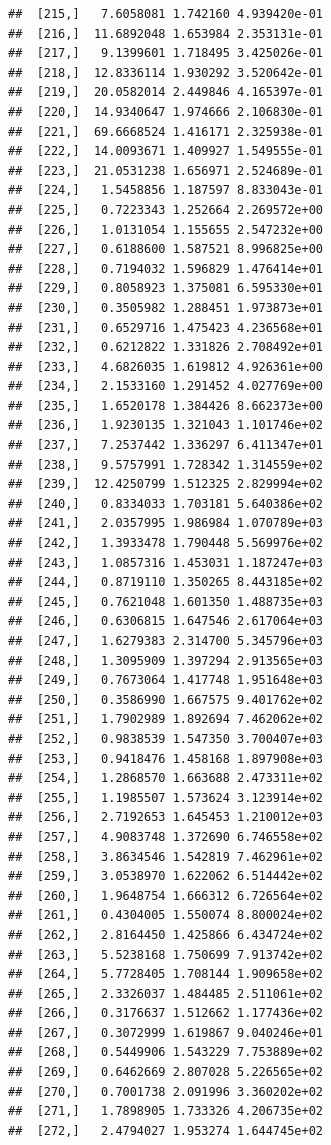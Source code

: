 \documentclass[article]{jss}\usepackage[]{graphicx}\usepackage[]{xcolor}
\makeatletter
\newenvironment{kframe}{%
 \def\at@end@of@kframe{}%
 \ifinner\ifhmode%
  \def\at@end@of@kframe{\end{minipage}}%
  \begin{minipage}{\columnwidth}%
 \fi\fi%
 \def\FrameCommand##1{\hskip\@totalleftmargin \hskip-\fboxsep
 \colorbox{shadecolor}{##1}\hskip-\fboxsep
     \hskip-\linewidth \hskip-\@totalleftmargin \hskip\columnwidth}%
 \MakeFramed {\advance\hsize-\width
   \@totalleftmargin\z@ \linewidth\hsize
   \@setminipage}}%
 {\par\unskip\endMakeFramed%
 \at@end@of@kframe}
\newenvironment{knitrout}{}{} %
\makeatother
\begin{document}
\begin{knitrout}
\begin{kframe}
\begin{verbatim}
##  [215,]   7.6058081 1.742160 4.939420e-01
##  [216,]  11.6892048 1.653984 2.353131e-01
##  [217,]   9.1399601 1.718495 3.425026e-01
##  [218,]  12.8336114 1.930292 3.520642e-01
##  [219,]  20.0582014 2.449846 4.165397e-01
##  [220,]  14.9340647 1.974666 2.106830e-01
##  [221,]  69.6668524 1.416171 2.325938e-01
##  [222,]  14.0093671 1.409927 1.549555e-01
##  [223,]  21.0531238 1.656971 2.524689e-01
##  [224,]   1.5458856 1.187597 8.833043e-01
##  [225,]   0.7223343 1.252664 2.269572e+00
##  [226,]   1.0131054 1.155655 2.547232e+00
##  [227,]   0.6188600 1.587521 8.996825e+00
##  [228,]   0.7194032 1.596829 1.476414e+01
##  [229,]   0.8058923 1.375081 6.595330e+01
##  [230,]   0.3505982 1.288451 1.973873e+01
##  [231,]   0.6529716 1.475423 4.236568e+01
##  [232,]   0.6212822 1.331826 2.708492e+01
##  [233,]   4.6826035 1.619812 4.926361e+00
##  [234,]   2.1533160 1.291452 4.027769e+00
##  [235,]   1.6520178 1.384426 8.662373e+00
##  [236,]   1.9230135 1.321043 1.101746e+02
##  [237,]   7.2537442 1.336297 6.411347e+01
##  [238,]   9.5757991 1.728342 1.314559e+02
##  [239,]  12.4250799 1.512325 2.829994e+02
##  [240,]   0.8334033 1.703181 5.640386e+02
##  [241,]   2.0357995 1.986984 1.070789e+03
##  [242,]   1.3933478 1.790448 5.569976e+02
##  [243,]   1.0857316 1.453031 1.187247e+03
##  [244,]   0.8719110 1.350265 8.443185e+02
##  [245,]   0.7621048 1.601350 1.488735e+03
##  [246,]   0.6306815 1.647546 2.617064e+03
##  [247,]   1.6279383 2.314700 5.345796e+03
##  [248,]   1.3095909 1.397294 2.913565e+03
##  [249,]   0.7673064 1.417748 1.951648e+03
##  [250,]   0.3586990 1.667575 9.401762e+02
##  [251,]   1.7902989 1.892694 7.462062e+02
##  [252,]   0.9838539 1.547350 3.700407e+03
##  [253,]   0.9418476 1.458168 1.897908e+03
##  [254,]   1.2868570 1.663688 2.473311e+02
##  [255,]   1.1985507 1.573624 3.123914e+02
##  [256,]   2.7192653 1.645453 1.210012e+03
##  [257,]   4.9083748 1.372690 6.746558e+02
##  [258,]   3.8634546 1.542819 7.462961e+02
##  [259,]   3.0538970 1.622062 6.514442e+02
##  [260,]   1.9648754 1.666312 6.726564e+02
##  [261,]   0.4304005 1.550074 8.800024e+02
##  [262,]   2.8164450 1.425866 6.434724e+02
##  [263,]   5.5238168 1.750699 7.913742e+02
##  [264,]   5.7728405 1.708144 1.909658e+02
##  [265,]   2.3326037 1.484485 2.511061e+02
##  [266,]   0.3176637 1.512662 1.177436e+02
##  [267,]   0.3072999 1.619867 9.040246e+01
##  [268,]   0.5449906 1.543229 7.753889e+02
##  [269,]   0.6462669 2.807028 5.226565e+02
##  [270,]   0.7001738 2.091996 3.360202e+02
##  [271,]   1.7898905 1.733326 4.206735e+02
##  [272,]   2.4794027 1.953274 1.644745e+02

\end{verbatim}
\end{kframe}
\end{knitrout}
\end{document}
